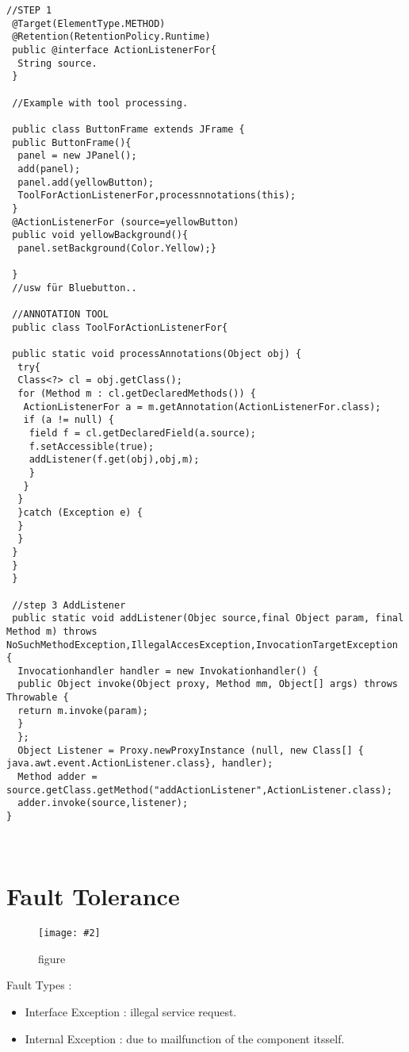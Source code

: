 \documentclass[a4paper,10pt]{scrreprt}
\newcommand{\pic}[2][figure]{\begin{figure}[h]
 \centering
 \texttt{[image: \#2]}
 \caption{#1}
\end{figure}
}
\begin{document}
\begin{lstlisting}[caption=Custom Listener Steps]
 //STEP 1
 @Target(ElementType.METHOD)
 @Retention(RetentionPolicy.Runtime)
 public @interface ActionListenerFor{
  String source.
 }
 
 //Example with tool processing.
 
 public class ButtonFrame extends JFrame {
 public ButtonFrame(){
  panel = new JPanel();
  add(panel);
  panel.add(yellowButton);
  ToolForActionListenerFor,processnnotations(this);
 }
 @ActionListenerFor (source=yellowButton)
 public void yellowBackground(){
  panel.setBackground(Color.Yellow);}
  
 }
 //usw für Bluebutton..
 
 //ANNOTATION TOOL
 public class ToolForActionListenerFor{
 
 public static void processAnnotations(Object obj) {
  try{
  Class<?> cl = obj.getClass();
  for (Method m : cl.getDeclaredMethods()) {
   ActionListenerFor a = m.getAnnotation(ActionListenerFor.class);
   if (a != null) {
    field f = cl.getDeclaredField(a.source);
    f.setAccessible(true);
    addListener(f.get(obj),obj,m);
    }
   }
  }
  }catch (Exception e) {
  }
  }
 }
 }
 }
 
 //step 3 AddListener
 public static void addListener(Objec source,final Object param, final Method m) throws 
NoSuchMethodException,IllegalAccesException,InvocationTargetException {
  Invocationhandler handler = new Invokationhandler() {
  public Object invoke(Object proxy, Method mm, Object[] args) throws Throwable {
  return m.invoke(param);
  }
  };
  Object Listener = Proxy.newProxyInstance (null, new Class[] { java.awt.event.ActionListener.class}, handler);
  Method adder = source.getClass.getMethod("addActionListener",ActionListener.class); 
  adder.invoke(source,listener);
}
 
 
\end{lstlisting}

\section{Fault Tolerance}
\pic{ftr.png}

Fault Types :
\begin{itemize}
 \item Interface Exception : illegal service request.
 \item Internal Exception : due to mailfunction of the component itsself.
 
\end{itemize}
\end{document}
